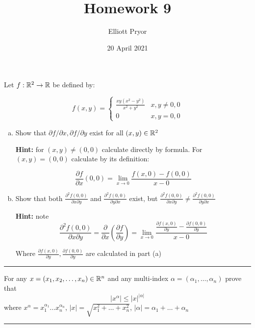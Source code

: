 \documentclass[11pt]{article}
\title{Homework 9}
\author{Elliott Pryor}
\date{20 April 2021}
\begin{document}
\maketitle


Let $f: \mathbb{R} ^2 \to \mathbb{R}$ be defined by:

$$f(x,y) = \begin{cases}
    \frac{xy(x^2-y^2)}{x^2 + y^2} & x,y \neq 0,0 \\
    0 & x, y = 0, 0
\end{cases}$$

\begin{enumerate}[(a)]
    \item Show that $\partial f / \partial x, \partial f / \partial y$ exist for all $(x, y) \in \mathbb{R} ^2$
    
    \textbf{Hint: } for $(x,y) \neq (0,0)$ calculate directly by formula. For $(x, y) = (0,0)$ calculate by its definition:

    $$\frac{\partial f}{\partial x}(0,0) = \lim_{x \to 0} \frac{f(x, 0) - f(0,0)}{x-0}$$

    \item Show that both $\frac{\partial ^2 f(0,0)}{\partial x \partial y}$ and $\frac{\partial ^2 f(0,0)}{\partial y \partial x}$
    exist, but $\frac{\partial ^2 f(0,0)}{\partial x \partial y} \neq \frac{\partial ^2 f(0,0)}{\partial y \partial x}$

    \textbf{Hint:} note
    $$\frac{\partial ^2 f(0,0)}{\partial x \partial y} = 
    \frac{\partial}{\partial x} \left( \frac{\partial f}{\partial y} \right) = 
    \lim_{x \to 0} \frac{\frac{\partial f(x,0)}{\partial y} - \frac{\partial f(0,0)}{\partial y}}{x - 0}$$

    Where $\frac{\partial f(x,0)}{\partial y}, \frac{\partial f(0,0)}{\partial y}$ are calculated in part (a)

\end{enumerate}
\hrule














For any $x = (x_1, x_2, \dots, x_n) \in \mathbb{R} ^n$ and any multi-index $\alpha = (\alpha_1, \dots, \alpha_n)$ prove that 
$$|x^\alpha| \leq |x|^{|\alpha|}$$
where $x^\alpha = x_1^{\alpha_1} \dots x_n^{\alpha_n}$, $|x| = \sqrt{x_1^2 + \dots + x_n^2}$, $|\alpha| = \alpha_1 + \dots + \alpha_n$

\hrule
\end{document}
